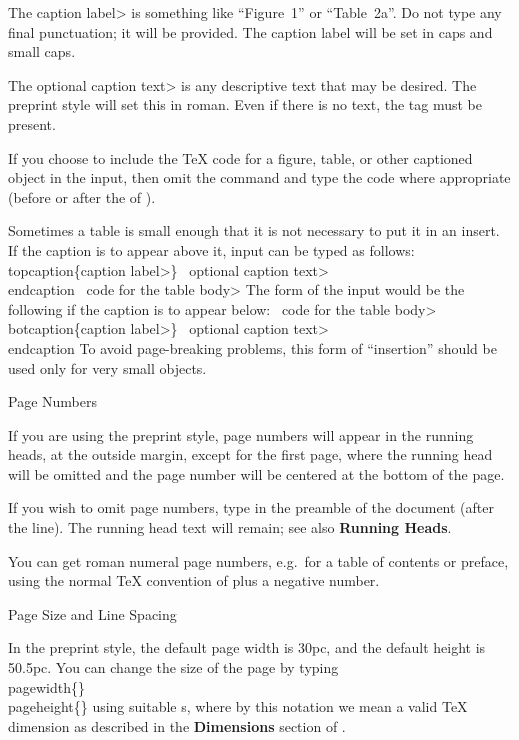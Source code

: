 The \<caption label> is something like ``Figure~1'' or ``Table~2a''.
Do not type any final punctuation; it will be provided.  The caption
label will be set in caps and small caps.

The \<optional caption text> is any descriptive text that may be desired.
The preprint style will set this in roman.  Even if there is no text, the
 tag must be present.

If you choose to include the \TeX{} code for a figure, table, or other
captioned object in the input, then omit the  command
and type the code where appropriate (before 
or after the  of ).

Sometimes a table is small enough that it is not necessary to put it in an
insert.  If the caption is to appear above it, input can be typed as follows:
\beginexample{}
\\topcaption\{\<caption label>\}
\ \<optional caption text>
\\endcaption
\ \<code for the table body>
\endexample
\noindent
The form of the input would be the following if the caption is to appear below:
\beginexample{}
\ \<code for the table body>
\\botcaption\{\<caption label>\}
\ \<optional caption text>
\\endcaption
\endexample
\noindent
To avoid page-breaking problems,
this form of ``insertion'' should be used only for very small objects.


\subhead Page Numbers \endsubhead

If you are using the preprint style, page numbers will appear in the running
heads, at the outside margin, except for the first page, where the running head
will be omitted and the page number will be centered at the bottom of the page.

If you wish to omit page numbers, type  in the preamble
of the document (after the  line).
The running head text will remain; see also {\bf Running Heads}.

You can get roman numeral page numbers, e.g.\ for a table of contents or
preface, using the normal \TeX{} convention of  plus
a negative number.


\subhead Page Size and Line Spacing \endsubhead

In the preprint style, the default page width is 30pc, and the default
height is 50.5pc.
You can change the size of the page by typing
\beginexample{}
\\pagewidth\{\Dimen\}\newline
\\pageheight\{\Dimen\}
\endexample
\noindent using suitable \Dimen{}s, where by this notation we mean a
valid \TeX{} dimension as described in the {\bf Dimensions} section of
\JoT{}.

